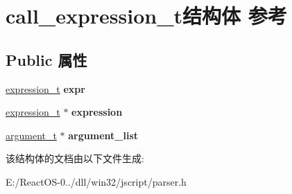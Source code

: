 \hypertarget{structcall__expression__t}{}\section{call\+\_\+expression\+\_\+t结构体 参考}
\label{structcall__expression__t}
\subsection*{Public 属性}
\begin{DoxyCompactItemize}
\item 
\mbox{\label{structcall__expression__t_a211194bb3b09c59784cb344ca92cf518}} 
\hyperlink{struct__expression__t}{expression\+\_\+t} {\bfseries expr}
\item 
\mbox{\label{structcall__expression__t_a0a47e8756e0ee12c8214c978546872d9}} 
\hyperlink{struct__expression__t}{expression\+\_\+t} $\ast$ {\bfseries expression}
\item 
\mbox{\label{structcall__expression__t_ade861fe447234d64d40a63b600f24dac}} 
\hyperlink{struct__argument__t}{argument\+\_\+t} $\ast$ {\bfseries argument\+\_\+list}
\end{DoxyCompactItemize}


该结构体的文档由以下文件生成\+:\begin{DoxyCompactItemize}
\item 
E\+:/\+React\+O\+S-\/0../dll/win32/jscript/parser.\+h\end{DoxyCompactItemize}
